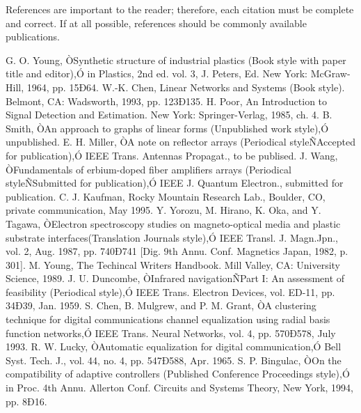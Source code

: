 \documentclass[a4paper, 10pt, conference]{ieeeconf}      %
\begin{document}
	
	
	
	References are important to the reader; therefore, each citation must be complete and correct. If at all possible, references should be commonly available publications.
	
	
	
	\begin{thebibliography}{99}
		
		 G. O. Young, ÒSynthetic structure of industrial plastics (Book style with paper title and editor),Ó 	in Plastics, 2nd ed. vol. 3, J. Peters, Ed.  New York: McGraw-Hill, 1964, pp. 15Ð64.
		 W.-K. Chen, Linear Networks and Systems (Book style).	Belmont, CA: Wadsworth, 1993, pp. 123Ð135.
		 H. Poor, An Introduction to Signal Detection and Estimation.   New York: Springer-Verlag, 1985, ch. 4.
		 B. Smith, ÒAn approach to graphs of linear forms (Unpublished work style),Ó unpublished.
		 E. H. Miller, ÒA note on reflector arrays (Periodical styleÑAccepted for publication),Ó IEEE Trans. Antennas Propagat., to be publised.
		 J. Wang, ÒFundamentals of erbium-doped fiber amplifiers arrays (Periodical styleÑSubmitted for publication),Ó IEEE J. Quantum Electron., submitted for publication.
		 C. J. Kaufman, Rocky Mountain Research Lab., Boulder, CO, private communication, May 1995.
		 Y. Yorozu, M. Hirano, K. Oka, and Y. Tagawa, ÒElectron spectroscopy studies on magneto-optical media and plastic substrate interfaces(Translation Journals style),Ó IEEE Transl. J. Magn.Jpn., vol. 2, Aug. 1987, pp. 740Ð741 [Dig. 9th Annu. Conf. Magnetics Japan, 1982, p. 301].
		 M. Young, The Techincal Writers Handbook.  Mill Valley, CA: University Science, 1989.
		 J. U. Duncombe, ÒInfrared navigationÑPart I: An assessment of feasibility (Periodical style),Ó IEEE Trans. Electron Devices, vol. ED-11, pp. 34Ð39, Jan. 1959.
		 S. Chen, B. Mulgrew, and P. M. Grant, ÒA clustering technique for digital communications channel equalization using radial basis function networks,Ó IEEE Trans. Neural Networks, vol. 4, pp. 570Ð578, July 1993.
		 R. W. Lucky, ÒAutomatic equalization for digital communication,Ó Bell Syst. Tech. J., vol. 44, no. 4, pp. 547Ð588, Apr. 1965.
		 S. P. Bingulac, ÒOn the compatibility of adaptive controllers (Published Conference Proceedings style),Ó in Proc. 4th Annu. Allerton Conf. Circuits and Systems Theory, New York, 1994, pp. 8Ð16.

\end{thebibliography}
\end{document}
